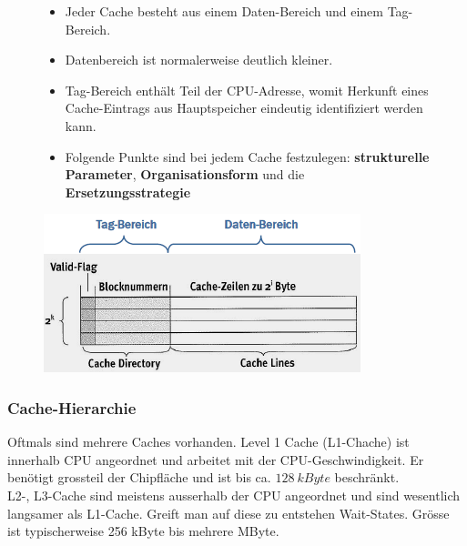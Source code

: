 \begin{figure}[htbp]
	
	\begin{minipage}{0.5\textwidth}		
		\begin{itemize}[noitemsep,topsep=0pt]
			\item Jeder Cache besteht aus einem Daten-Bereich und einem Tag-Bereich.
			\item Datenbereich ist normalerweise deutlich kleiner.
			\item Tag-Bereich enthält Teil der CPU-Adresse, womit Herkunft eines Cache-Eintrags aus Hauptspeicher eindeutig identifiziert werden kann.
			\item Folgende Punkte sind bei jedem Cache festzulegen: \textbf{strukturelle Parameter}, \textbf{Organisationsform} und die \textbf{Ersetzungsstrategie}
		\end{itemize}	
	\end{minipage}
	\hfill		
	\begin{minipage}{0.45\textwidth} 
		\includegraphics[width=\textwidth]{images/Speicherhierarchie/GrundstrukturCache.PNG}
	\end{minipage}
	
\end{figure}

\subsubsection{Cache-Hierarchie}
Oftmals sind mehrere Caches vorhanden. Level 1 Cache (L1-Chache) ist innerhalb CPU angeordnet und arbeitet mit der CPU-Geschwindigkeit.
Er benötigt grossteil der Chipfläche und ist bis ca. $128 \ kByte$ beschränkt.\\
L2-, L3-Cache sind meistens ausserhalb der CPU angeordnet und sind wesentlich langsamer als L1-Cache.
Greift man auf diese zu entstehen Wait-States. Grösse ist typischerweise 256 kByte bis mehrere MByte. \newline 

